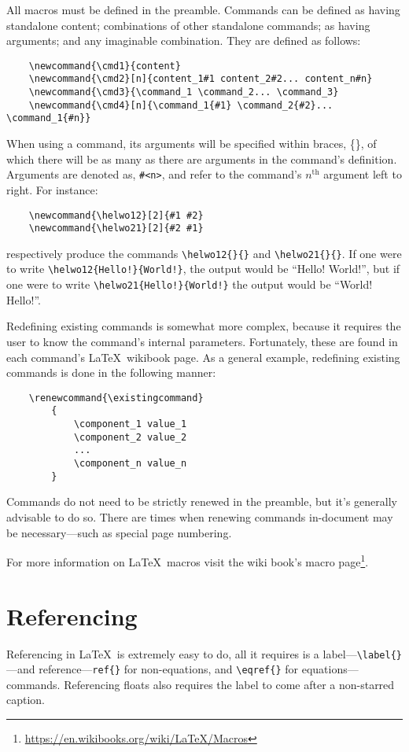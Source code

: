All macros must be defined in the preamble. Commands can be defined as having standalone content; combinations of other standalone commands; as having arguments; and any imaginable combination. They are defined as follows:
\begin{verbatim}
	\newcommand{\cmd1}{content}
	\newcommand{\cmd2}[n]{content_1#1 content_2#2... content_n#n}
	\newcommand{\cmd3}{\command_1 \command_2... \command_3}
	\newcommand{\cmd4}[n]{\command_1{#1} \command_2{#2}... \command_1{#n}}
\end{verbatim}
When using a command, its arguments will be specified within braces, \{\}, of which there will be as many as there are arguments in the command's definition. Arguments are denoted as, \verb|#<n>|, and refer to the command's $n^{\text{th}}$ argument left to right. For instance:
\begin{verbatim}
	\newcommand{\helwo12}[2]{#1 #2}
	\newcommand{\helwo21}[2]{#2 #1}
\end{verbatim}
respectively produce the commands \verb|\helwo12{}{}| and \verb|\helwo21{}{}|. If one were to write \verb|\helwo12{Hello!}{World!}|, the output would be ``Hello! World!'', but if one were to write \verb|\helwo21{Hello!}{World!}| the output would be ``World! Hello!''.

Redefining existing commands is somewhat more complex, because it requires the user to know the command's internal parameters. Fortunately, these are found in each command's \LaTeX~wikibook page. As a general example, redefining existing commands is done in the following manner:
\begin{verbatim}
	\renewcommand{\existingcommand}
	    {
	        \component_1 value_1
	        \component_2 value_2
	        ...
	        \component_n value_n
	    }
\end{verbatim}
Commands do not need to be strictly renewed in the preamble, but it's generally advisable to do so. There are times when renewing commands in-document may be necessary---such as special page numbering.

For more information on \LaTeX~macros visit the wiki book's macro page\footnote{\url{https://en.wikibooks.org/wiki/LaTeX/Macros}}.
%
\section{Referencing}
%
Referencing in \LaTeX~is extremely easy to do, all it requires is a label---\verb|\label{}|---and reference---\verb|ref{}| for non-equations, and \verb|\eqref{}| for equations---commands. Referencing floats also requires the label to come after a non-starred caption. 

